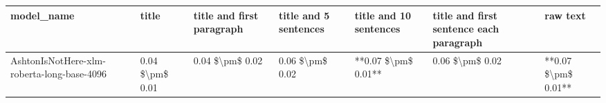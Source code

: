 \begin{tabular}{lllllll}
\toprule
                                model\_name &           title & title and first paragraph & title and 5 sentences & title and 10 sentences & title and first sentence each paragraph &            raw text \\
\midrule
AshtonIsNotHere-xlm-roberta-long-base-4096 & 0.04 \$\textbackslash pm\$ 0.01 &           0.04 \$\textbackslash pm\$ 0.02 &       0.06 \$\textbackslash pm\$ 0.02 &    **0.07 \$\textbackslash pm\$ 0.01** &                         0.06 \$\textbackslash pm\$ 0.02 & **0.07 \$\textbackslash pm\$ 0.01** \\
\bottomrule
\end{tabular}

